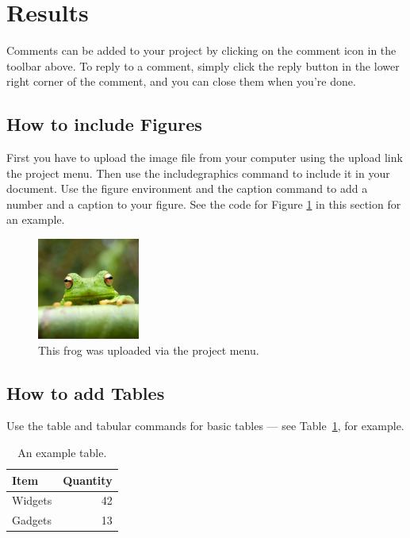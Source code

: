 \documentclass{article}
\begin{document}
\section{Results}

Comments can be added to your project by clicking on the comment icon in the toolbar above. %
%
%
To reply to a comment, simply click the reply button in the lower right corner of the comment, and you can close them when you're done.

\subsection{How to include Figures}

First you have to upload the image file from your computer using the upload link the project menu. Then use the includegraphics command to include it in your document. Use the figure environment and the caption command to add a number and a caption to your figure. See the code for Figure \ref{fig:frog} in this section for an example.

\begin{figure}
\centering
\includegraphics[width=0.3\textwidth]{frog.jpg}
\caption{\label{fig:frog}This frog was uploaded via the project menu.}
\end{figure}

\subsection{How to add Tables}

Use the table and tabular commands for basic tables --- see Table~\ref{tab:widgets}, for example. 

\begin{table}
\centering
\begin{tabular}{l|r}
Item & Quantity \\\hline
Widgets & 42 \\
Gadgets & 13
\end{tabular}
\caption{\label{tab:widgets}An example table.}
\end{table}
\end{document}
